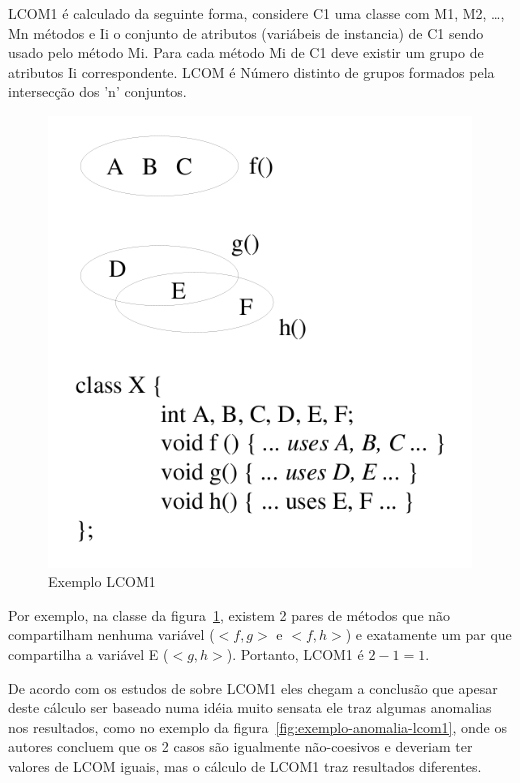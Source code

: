 LCOM1 é calculado da seguinte forma, considere C1 uma classe com M1, M2,
\ldots, Mn métodos e Ii o conjunto de atributos (variábeis de instancia) de C1
sendo usado pelo método Mi. Para cada método Mi de C1 deve existir um grupo de
atributos Ii correspondente. LCOM é Número distinto de grupos formados pela
intersecção dos 'n' conjuntos.

\begin{figure}[h]
\center
\includegraphics[scale=0.4]{imagens/exemplo-lcom1-hitz-e-montazeri}
\caption{Exemplo LCOM1 \cite{measuringCouplingAndCohesion}}
\label{fig:exemplo-lcom1}
\end{figure}

Por exemplo, na classe da figura~\ref{fig:exemplo-lcom1}, existem 2 pares de
métodos que não compartilham nenhuma variável ($<f, g>$ e $<f, h>$) e
exatamente um par que compartilha a variável E ($<g, h>$). Portanto, LCOM1 é $2
- 1 = 1$.

De acordo com os estudos de  sobre
LCOM1 eles chegam a conclusão que apesar deste cálculo ser baseado numa idéia
muito sensata ele traz algumas anomalias nos resultados, como no exemplo da
figura~\ref{fig:exemplo-anomalia-lcom1}, onde os autores concluem que os 2
casos são igualmente não-coesivos e deveriam ter valores de LCOM iguais, mas
o cálculo de LCOM1 traz resultados diferentes.


